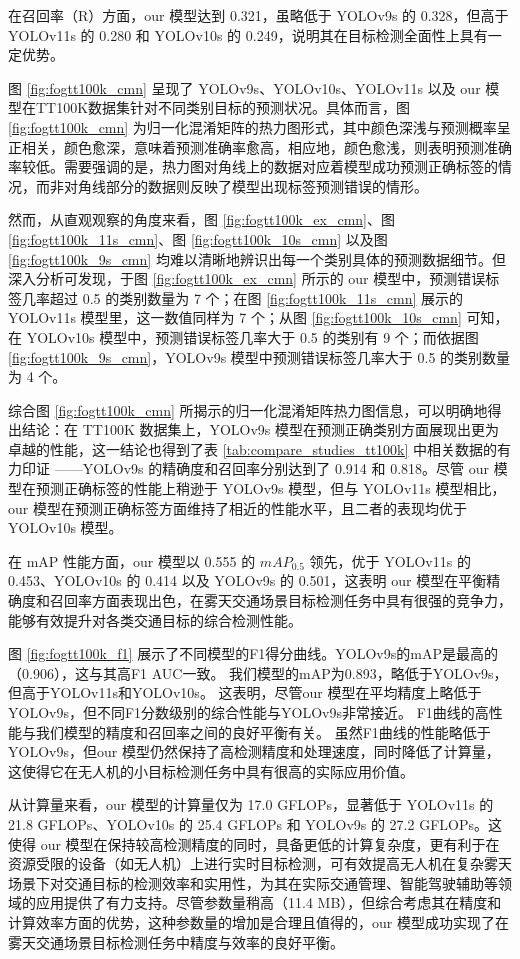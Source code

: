 在召回率（R）方面，our 模型达到 0.321，虽略低于 YOLOv9s 的 0.328，但高于 YOLOv11s 的 0.280 和 YOLOv10s 的 0.249，说明其在目标检测全面性上具有一定优势。

图 \ref{fig:fogtt100k_cmn} 呈现了 YOLOv9s、YOLOv10s、YOLOv11s 以及 our 模型在TT100K数据集针对不同类别目标的预测状况。具体而言，图 \ref{fig:fogtt100k_cmn} 为归一化混淆矩阵的热力图形式，其中颜色深浅与预测概率呈正相关，颜色愈深，意味着预测准确率愈高，相应地，颜色愈浅，则表明预测准确率较低。需要强调的是，热力图对角线上的数据对应着模型成功预测正确标签的情况，而非对角线部分的数据则反映了模型出现标签预测错误的情形。

然而，从直观观察的角度来看，图 \ref{fig:fogtt100k_ex_cmn}、图 \ref{fig:fogtt100k_11s_cmn}、图 \ref{fig:fogtt100k_10s_cmn} 以及图 \ref{fig:fogtt100k_9s_cmn} 均难以清晰地辨识出每一个类别具体的预测数据细节。但深入分析可发现，于图 \ref{fig:fogtt100k_ex_cmn} 所示的 our 模型中，预测错误标签几率超过 0.5 的类别数量为 7 个；在图 \ref{fig:fogtt100k_11s_cmn} 展示的 YOLOv11s 模型里，这一数值同样为 7 个；从图 \ref{fig:fogtt100k_10s_cmn} 可知，在 YOLOv10s 模型中，预测错误标签几率大于 0.5 的类别有 9 个；而依据图 \ref{fig:fogtt100k_9s_cmn}，YOLOv9s 模型中预测错误标签几率大于 0.5 的类别数量为 4 个。

综合图 \ref{fig:fogtt100k_cmn} 所揭示的归一化混淆矩阵热力图信息，可以明确地得出结论：在 TT100K 数据集上，YOLOv9s 模型在预测正确类别方面展现出更为卓越的性能，这一结论也得到了表 \ref{tab:compare_studies_tt100k} 中相关数据的有力印证 ——YOLOv9s 的精确度和召回率分别达到了 0.914 和 0.818。尽管 our 模型在预测正确标签的性能上稍逊于 YOLOv9s 模型，但与 YOLOv11s 模型相比，our 模型在预测正确标签方面维持了相近的性能水平，且二者的表现均优于 YOLOv10s 模型。

在 mAP 性能方面，our 模型以 0.555 的 $mAP_{0.5}$ 领先，优于 YOLOv11s 的 0.453、YOLOv10s 的 0.414 以及 YOLOv9s 的 0.501，这表明 our 模型在平衡精确度和召回率方面表现出色，在雾天交通场景目标检测任务中具有很强的竞争力，能够有效提升对各类交通目标的综合检测性能。

图 \ref{fig:fogtt100k_f1} 展示了不同模型的F1得分曲线。YOLOv9s的mAP是最高的（0.906），这与其高F1 AUC一致。 我们模型的mAP为0.893，略低于YOLOv9s，但高于YOLOv11s和YOLOv10s。 这表明，尽管our 模型在平均精度上略低于YOLOv9s，但不同F1分数级别的综合性能与YOLOv9s非常接近。 F1曲线的高性能与我们模型的精度和召回率之间的良好平衡有关。 虽然F1曲线的性能略低于YOLOv9s，但our 模型仍然保持了高检测精度和处理速度，同时降低了计算量，这使得它在无人机的小目标检测任务中具有很高的实际应用价值。

从计算量来看，our 模型的计算量仅为 17.0 GFLOPs，显著低于 YOLOv11s 的 21.8 GFLOPs、YOLOv10s 的 25.4 GFLOPs 和 YOLOv9s 的 27.2 GFLOPs。这使得 our 模型在保持较高检测精度的同时，具备更低的计算复杂度，更有利于在资源受限的设备（如无人机）上进行实时目标检测，可有效提高无人机在复杂雾天场景下对交通目标的检测效率和实用性，为其在实际交通管理、智能驾驶辅助等领域的应用提供了有力支持。尽管参数量稍高（11.4 MB），但综合考虑其在精度和计算效率方面的优势，这种参数量的增加是合理且值得的，our 模型成功实现了在雾天交通场景目标检测任务中精度与效率的良好平衡。


